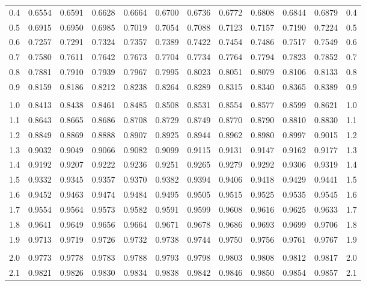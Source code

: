 \documentclass[12pt]{article}
\begin{document}
\begin{landscape}
\begin{adjustbox}{angle=270}
\begin{tabular}{
  r 
  @{\hspace{4.5mm}}
  *{5}{c @{\hspace{2.5mm}}} 
  @{\hspace{-0.5mm}}
  *{5}{@{\hspace{2.5mm}} c} 
  @{\hspace{2mm}}
  r
  }
0.4	&	0.6554	&	0.6591	&	0.6628	&	0.6664	&	0.6700	&	0.6736	&	0.6772	&	0.6808	&	0.6844	&	0.6879	&	0.4	\\
0.5	&	0.6915	&	0.6950	&	0.6985	&	0.7019	&	0.7054	&	0.7088	&	0.7123	&	0.7157	&	0.7190	&	0.7224	&	0.5	\\
0.6	&	0.7257	&	0.7291	&	0.7324	&	0.7357	&	0.7389	&	0.7422	&	0.7454	&	0.7486	&	0.7517	&	0.7549	&	0.6	\\
0.7	&	0.7580	&	0.7611	&	0.7642	&	0.7673	&	0.7704	&	0.7734	&	0.7764	&	0.7794	&	0.7823	&	0.7852	&	0.7	\\
0.8	&	0.7881	&	0.7910	&	0.7939	&	0.7967	&	0.7995	&	0.8023	&	0.8051	&	0.8079	&	0.8106	&	0.8133	&	0.8	\\
0.9	&	0.8159	&	0.8186	&	0.8212	&	0.8238	&	0.8264	&	0.8289	&	0.8315	&	0.8340	&	0.8365	&	0.8389	&	0.9	\\
&&&&&&&&&&{} \\																							
1.0	&	0.8413	&	0.8438	&	0.8461	&	0.8485	&	0.8508	&	0.8531	&	0.8554	&	0.8577	&	0.8599	&	0.8621	&	1.0	\\
1.1	&	0.8643	&	0.8665	&	0.8686	&	0.8708	&	0.8729	&	0.8749	&	0.8770	&	0.8790	&	0.8810	&	0.8830	&	1.1	\\
1.2	&	0.8849	&	0.8869	&	0.8888	&	0.8907	&	0.8925	&	0.8944	&	0.8962	&	0.8980	&	0.8997	&	0.9015	&	1.2	\\
1.3	&	0.9032	&	0.9049	&	0.9066	&	0.9082	&	0.9099	&	0.9115	&	0.9131	&	0.9147	&	0.9162	&	0.9177	&	1.3	\\
1.4	&	0.9192	&	0.9207	&	0.9222	&	0.9236	&	0.9251	&	0.9265	&	0.9279	&	0.9292	&	0.9306	&	0.9319	&	1.4	\\
1.5	&	0.9332	&	0.9345	&	0.9357	&	0.9370	&	0.9382	&	0.9394	&	0.9406	&	0.9418	&	0.9429	&	0.9441	&	1.5	\\
1.6	&	0.9452	&	0.9463	&	0.9474	&	0.9484	&	0.9495	&	0.9505	&	0.9515	&	0.9525	&	0.9535	&	0.9545	&	1.6	\\
1.7	&	0.9554	&	0.9564	&	0.9573	&	0.9582	&	0.9591	&	0.9599	&	0.9608	&	0.9616	&	0.9625	&	0.9633	&	1.7	\\
1.8	&	0.9641	&	0.9649	&	0.9656	&	0.9664	&	0.9671	&	0.9678	&	0.9686	&	0.9693	&	0.9699	&	0.9706	&	1.8	\\
1.9	&	0.9713	&	0.9719	&	0.9726	&	0.9732	&	0.9738	&	0.9744	&	0.9750	&	0.9756	&	0.9761	&	0.9767	&	1.9	\\
&&&&&&&&&&{} \\																							
2.0	&	0.9773	&	0.9778	&	0.9783	&	0.9788	&	0.9793	&	0.9798	&	0.9803	&	0.9808	&	0.9812	&	0.9817	&	2.0	\\
2.1	&	0.9821	&	0.9826	&	0.9830	&	0.9834	&	0.9838	&	0.9842	&	0.9846	&	0.9850	&	0.9854	&	0.9857	&	2.1	\\

\end{tabular}
\end{adjustbox}
\end{landscape}
\end{document}
